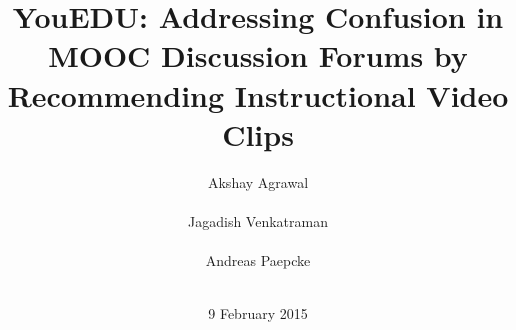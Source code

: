 \documentclass{edm_template}
\begin{document}
\title{YouEDU: Addressing Confusion in MOOC Discussion Forums by Recommending Instructional Video Clips}
%
%
%
%
%

%
\author{
%
%
\alignauthor Akshay Agrawal\\
       \\
\alignauthor Jagadish Venkatraman\\
       \\
\alignauthor Andreas Paepcke\\
       \\
}
\date{9 February 2015}
\end{document}
